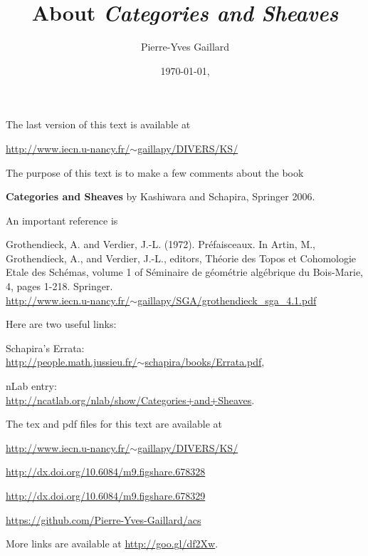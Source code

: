 \documentclass[12pt]{article}
\title{About \em{Categories and Sheaves}}
\author{Pierre-Yves Gaillard}
\date{\today, \currenttime}
\theoremstyle{remark}
\newcommand{\n}{\noindent}
\begin{document}
\maketitle

\n The last version of this text is available at

\n\href{http://www.iecn.u-nancy.fr/~gaillapy/DIVERS/KS/}{http://www.iecn.u-nancy.fr/$\sim$gaillapy/DIVERS/KS/}

\tableofcontents%
\bigskip%

\n The purpose of this text is to make a few comments about the book

\n[KS] \textbf{Categories and Sheaves} by Kashiwara and Schapira, Springer 2006.

An important reference is

\n[GV] Grothendieck, A. and Verdier, J.-L. (1972). Pr\'efaisceaux. In Artin, M., Grothendieck, A., and Verdier, J.-L., editors, Th\'eorie des Topos et Cohomologie Etale des Sch\'emas, volume 1 of S\'eminaire de g\'eom\'etrie alg\'ebrique du Bois-Marie, 4, pages 1-218. Springer. \\ 
\n\href{http://www.iecn.u-nancy.fr/~gaillapy/SGA/grothendieck_sga_4.1.pdf}{http://www.iecn.u-nancy.fr/$\sim$gaillapy/SGA/grothendieck\_sga\_4.1.pdf} 

Here are two useful links:

\n Schapira's Errata:\\ \href{http://people.math.jussieu.fr/~schapira/books/Errata.pdf}{http://people.math.jussieu.fr/$\sim$schapira/books/Errata.pdf},

\n nLab entry:\\ \href{http://ncatlab.org/nlab/show/Categories+and+Sheaves}{http://ncatlab.org/nlab/show/Categories+and+Sheaves}. 

The tex and pdf files for this text are available at 
 
\n\href{http://www.iecn.u-nancy.fr/~gaillapy/DIVERS/KS/}{http://www.iecn.u-nancy.fr/$\sim$gaillapy/DIVERS/KS/} 
 
\n\href{http://dx.doi.org/10.6084/m9.figshare.678328}{http://dx.doi.org/10.6084/m9.figshare.678328} 
 
\n\href{http://dx.doi.org/10.6084/m9.figshare.678329}{http://dx.doi.org/10.6084/m9.figshare.678329} 

\n\href{https://github.com/Pierre-Yves-Gaillard/acs}{https://github.com/Pierre-Yves-Gaillard/acs} 

More links are available at \href{http://goo.gl/df2Xw}{http://goo.gl/df2Xw}.
\end{document}
